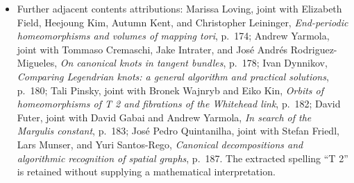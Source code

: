 \documentclass[11pt]{article}
\begin{document}
\begin{itemize}
\item Further adjacent contents attributions: Marissa Loving, joint with Elizabeth Field, Heejoung Kim, Autumn Kent, and Christopher Leininger, \emph{End-periodic homeomorphisms and volumes of mapping tori}, p.\ 174; Andrew Yarmola, joint with Tommaso Cremaschi, Jake Intrater, and José Andrés Rodriguez-Migueles, \emph{On canonical knots in tangent bundles}, p.\ 178; Ivan Dynnikov, \emph{Comparing Legendrian knots: a general algorithm and practical solutions}, p.\ 180; Tali Pinsky, joint with Bronek Wajnryb and Eiko Kin, \emph{Orbits of homeomorphisms of T 2 and fibrations of the Whitehead link}, p.\ 182; David Futer, joint with David Gabai and Andrew Yarmola, \emph{In search of the Margulis constant}, p.\ 183; José Pedro Quintanilha, joint with Stefan Friedl, Lars Munser, and Yuri Santos-Rego, \emph{Canonical decompositions and algorithmic recognition of spatial graphs}, p.\ 187. The extracted spelling ``T 2'' is retained without supplying a mathematical interpretation.
\end{itemize}
\end{document}
